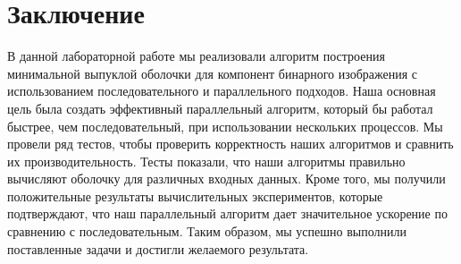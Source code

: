 \section{Заключение}
В данной лабораторной работе мы реализовали алгоритм построения минимальной выпуклой оболочки для компонент бинарного изображения с использованием последовательного и параллельного подходов.\n
Наша основная цель была создать эффективный параллельный алгоритм, который бы работал быстрее, чем последовательный, при использовании нескольких процессов.\n
Мы провели ряд тестов, чтобы проверить корректность наших алгоритмов и сравнить их производительность. Тесты показали, что наши алгоритмы правильно вычисляют оболочку для различных входных данных. Кроме того, мы получили положительные результаты вычислительных экспериментов, которые подтверждают, что наш параллельный алгоритм дает значительное ускорение по сравнению с последовательным.\n
Таким образом, мы успешно выполнили поставленные задачи и достигли желаемого результата.